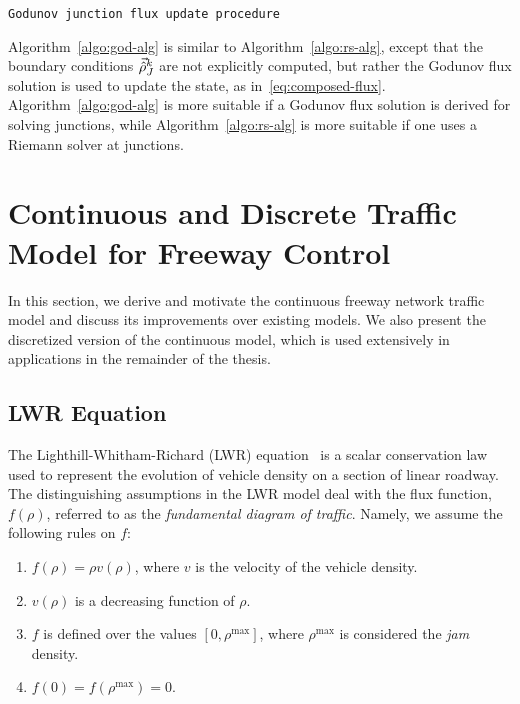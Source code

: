 \begin{algorithm}[h]
\caption{\texttt{Godunov junction flux update procedure}}



\end{algorithm}


Algorithm~\ref{algo:god-alg} is similar to Algorithm~\ref{algo:rs-alg},
except that the boundary conditions $\vec{\hat{\rho}}_{J}^{k}$ are
not explicitly computed, but rather the Godunov flux solution is used
to update the state, as in~\ref{eq:composed-flux}. Algorithm~\ref{algo:god-alg}
is more suitable if a Godunov flux solution is derived for solving
junctions, while Algorithm~\ref{algo:rs-alg} is more suitable if
one uses a Riemann solver at junctions.


\section{Continuous and Discrete Traffic Model for Freeway Control}
\label{sec:continous-and-discrete-traffic-model-for-ramp-metering}

In this section, we derive and motivate the continuous freeway network traffic model and discuss its improvements over existing models. We also present the discretized version of the continuous model, which is used extensively in applications in the remainder of the thesis. 

\subsection{LWR Equation}

The Lighthill-Whitham-Richard (LWR) equation~\cite{lighthill1955kinematic,richards1956shock} is a scalar conservation law used to represent the evolution of vehicle density on a section of linear roadway. The distinguishing assumptions in the LWR model deal with the flux function, $f\left(\rho\right)$, referred to as the \emph{fundamental diagram of traffic}. Namely, we assume the following rules on $f$:

\begin{enumerate}
	\item $f\left(\rho \right) = \rho v\left(\rho \right)$, where $v$ is the velocity of the vehicle density.
	\item $v\left(\rho \right)$ is a decreasing function of $\rho$.
	\item $f$ is defined over the values $\left[0,\rho^{\max}\right]$, where $\rho^{\max}$ is considered the \emph{jam} density.
	\item $f\left(0\right) = f\left(\rho^{\max}\right) = 0$.
\end{enumerate}

